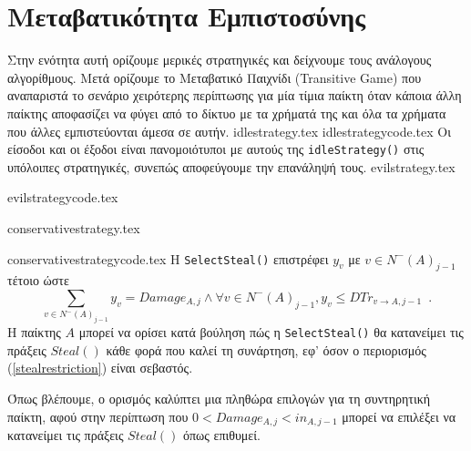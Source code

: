 \section{Μεταβατικότητα Εμπιστοσύνης}
  Στην ενότητα αυτή ορίζουμε μερικές στρατηγικές και δείχνουμε τους ανάλογους αλγορίθμους. Μετά ορίζουμε το Μεταβατικό
  Παιχνίδι (\textlatin{Transitive Game}) που αναπαριστά το σενάριο χειρότερης περίπτωσης για μία τίμια παίκτη όταν κάποια
  άλλη παίκτης αποφασίζει να φύγει από το δίκτυο με τα χρήματά της και όλα τα χρήματα που άλλες εμπιστεύονται άμεσα σε αυτήν.
  {idlestrategy.tex}
  \newpage
  {idlestrategycode.tex}
  Οι είσοδοι και οι έξοδοι είναι πανομοιότυποι με αυτούς της \texttt{\textlatin{idleStrategy()}} στις υπόλοιπες στρατηγικές,
  συνεπώς αποφεύγουμε την επανάληψή τους.
  {evilstrategy.tex}

  {evilstrategycode.tex}

  {conservativestrategy.tex}

  {conservativestrategycode.tex}
  Η \texttt{\textlatin{SelectSteal()}} επιστρέφει $y_v$ με $v \in N^{-}\left(A\right)_{j-1}$ τέτοιο ώστε
  \begin{equation}
  \label{stealrestriction}
     \sum\limits_{v \in N^{-}\left(A\right)_{j-1}}y_v = Damage_{A, j} \wedge \forall v \in N^{-}\left(A\right)_{j-1},
     y_v \leq DTr_{v \rightarrow A, j-1} \enspace.
  \end{equation}
  Η παίκτης $A$ μπορεί να ορίσει κατά βούληση πώς η \texttt{\textlatin{SelectSteal()}} θα κατανείμει τις πράξεις
  $Steal\left(\right)$ κάθε φορά που καλεί τη συνάρτηση, εφ' όσον ο περιορισμός (\ref{stealrestriction}) είναι σεβαστός.

  Όπως βλέπουμε, ο ορισμός καλύπτει μια πληθώρα επιλογών για τη συντηρητική παίκτη, αφού στην περίπτωση που $0 < Damage_{A,j}
  < in_{A,j-1}$ μπορεί να επιλέξει να κατανείμει τις πράξεις $Steal\left(\right)$ όπως επιθυμεί.

